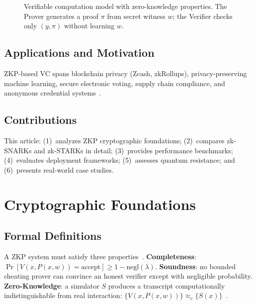 \documentclass[sigconf,nonacm]{acmart}
\begin{document}
\begin{figure}[h]
\caption{Verifiable computation model with zero-knowledge properties.  The Prover
  generates a proof $\pi$ from secret witness $w$; the Verifier checks only
  $(y,\pi)$ without learning $w$.}
\label{fig:vc_model}
\end{figure}

\subsection{Applications and Motivation}

ZKP-based VC spans blockchain privacy (Zcash, zkRollups), privacy-preserving machine
learning, secure electronic voting, supply chain compliance, and anonymous credential
systems~\cite{blockchain_zkp_2023,zkml_2023,evoting_zkp_2022}.

\subsection{Contributions}

This article: (1)~analyzes ZKP cryptographic foundations; (2)~compares zk-SNARKs and
zk-STARKs in detail; (3)~provides performance benchmarks; (4)~evaluates deployment
frameworks; (5)~assesses quantum resistance; and (6)~presents real-world case studies.

\section{Cryptographic Foundations}
\label{sec:foundations}

\subsection{Formal Definitions}

A ZKP system must satisfy three properties~\cite{zkp_foundations_2022,security_definitions_2023}.
\textbf{Completeness}: $\Pr[V(x,P(x,w))=\text{accept}]\geq 1-\text{negl}(\lambda)$.
\textbf{Soundness}: no bounded cheating prover can convince an honest verifier
except with negligible probability.
\textbf{Zero-Knowledge}: a simulator $S$ produces a transcript computationally
indistinguishable from real interaction: $\{V(x,P(x,w))\}\approx_c\{S(x)\}$~\cite{zk_simulation_2023}.
\end{document}
